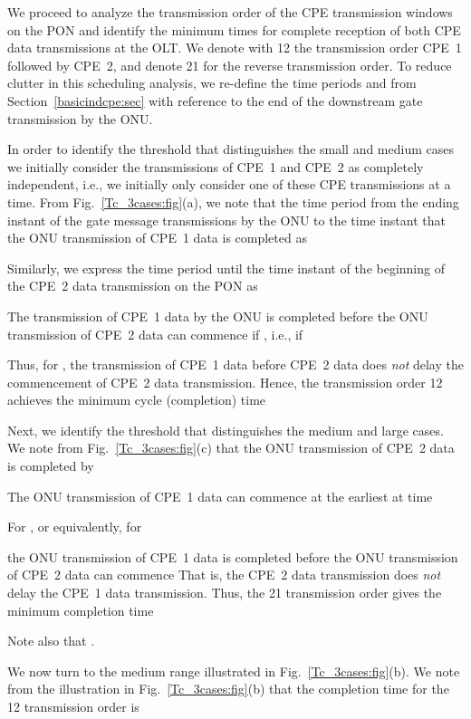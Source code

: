 \documentclass[pdftex,journal]{IEEEtran}
\begin{document}
We proceed to analyze the transmission order of the CPE transmission
windows on the PON and identify the minimum times for complete
reception of both CPE data transmissions at the OLT.
We denote with 12 the transmission order CPE~1 followed by
CPE~2, and denote 21 for the reverse transmission order.
To reduce clutter in this scheduling analysis, we re-define the
time periods  and  from Section~\ref{basicindcpe:sec} with
reference to the end of the downstream gate transmission by the ONU.

In order to identify the threshold 
that distinguishes the small and
medium  cases we
initially consider the transmissions of CPE~1 and CPE~2 as completely
independent, i.e., we initially only consider one of these CPE
transmissions at a time.
From Fig.~\ref{Tc_3cases:fig}(a), we note that
the time period from the ending instant of the gate message transmissions
by the ONU to the time instant that
the ONU transmission of CPE~1 data is completed as

Similarly, we express the time period until the time instant of
the beginning of the CPE~2 data transmission on the PON as

The transmission of CPE~1 data by the ONU is completed before
the ONU transmission of CPE~2 data can commence if
, i.e., if

 Thus, for , the transmission of CPE~1 data before
CPE~2 data does \textit{not} delay the commencement of CPE~2 data
transmission. Hence, the transmission order 12 achieves the
minimum cycle (completion) time


Next, we identify the threshold  that distinguishes
the medium and large  cases.
We note from Fig.~\ref{Tc_3cases:fig}(c) that
the ONU transmission of CPE~2 data is completed by

The ONU transmission of CPE~1 data can commence at the
earliest at time

For , or equivalently, for

 the ONU transmission of CPE~1 data is completed
before the ONU transmission of CPE~2 data can commence
That is, the CPE~2 data transmission does \textit{not} delay
the CPE~1 data transmission.
Thus, the 21 transmission order gives the minimum
completion time

Note also that .

We now turn to the medium  range illustrated in
Fig.~\ref{Tc_3cases:fig}(b).
We note from the illustration in Fig.~\ref{Tc_3cases:fig}(b) that the completion
time for the 12 transmission order is
\end{document}

